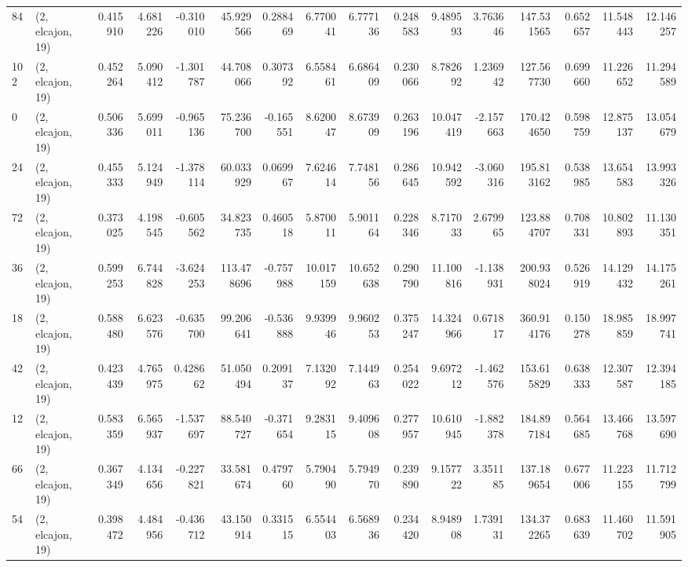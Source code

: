 \begin{tabular}{llrrrrrrrrrrrrrr}
84  &  (2, elcajon, 19) &   0.415910 &   4.681226 &  -0.310010 &    45.929566 &   0.288469 &   6.770041 &   6.777136 &  0.248583 &   9.489593 &   3.763646 &   147.531565 &  0.652657 &  11.548443 &  12.146257 \\
102 &  (2, elcajon, 19) &   0.452264 &   5.090412 &  -1.301787 &    44.708066 &   0.307392 &   6.558461 &   6.686409 &  0.230066 &   8.782692 &   1.236942 &   127.567730 &  0.699660 &  11.226652 &  11.294589 \\
0   &  (2, elcajon, 19) &   0.506336 &   5.699011 &  -0.965136 &    75.236700 &  -0.165551 &   8.620047 &   8.673909 &  0.263196 &  10.047419 &  -2.157663 &   170.424650 &  0.598759 &  12.875137 &  13.054679 \\
24  &  (2, elcajon, 19) &   0.455333 &   5.124949 &  -1.378114 &    60.033929 &   0.069967 &   7.624614 &   7.748156 &  0.286645 &  10.942592 &  -3.060316 &   195.813162 &  0.538985 &  13.654583 &  13.993326 \\
72  &  (2, elcajon, 19) &   0.373025 &   4.198545 &  -0.605562 &    34.823735 &   0.460518 &   5.870011 &   5.901164 &  0.228346 &   8.717033 &   2.679965 &   123.884707 &  0.708331 &  10.802893 &  11.130351 \\
36  &  (2, elcajon, 19) &   0.599253 &   6.744828 &  -3.624253 &   113.478696 &  -0.757988 &  10.017159 &  10.652638 &  0.290790 &  11.100816 &  -1.138931 &   200.938024 &  0.526919 &  14.129432 &  14.175261 \\
18  &  (2, elcajon, 19) &   0.588480 &   6.623576 &  -0.635700 &    99.206641 &  -0.536888 &   9.939946 &   9.960253 &  0.375247 &  14.324966 &   0.671817 &   360.914176 &  0.150278 &  18.985859 &  18.997741 \\
42  &  (2, elcajon, 19) &   0.423439 &   4.765975 &   0.428662 &    51.050494 &   0.209137 &   7.132092 &   7.144963 &  0.254022 &   9.697212 &  -1.462576 &   153.615829 &  0.638333 &  12.307587 &  12.394185 \\
12  &  (2, elcajon, 19) &   0.583359 &   6.565937 &  -1.537697 &    88.540727 &  -0.371654 &   9.283115 &   9.409608 &  0.277957 &  10.610945 &  -1.882378 &   184.897184 &  0.564685 &  13.466768 &  13.597690 \\
66  &  (2, elcajon, 19) &   0.367349 &   4.134656 &  -0.227821 &    33.581674 &   0.479760 &   5.790490 &   5.794970 &  0.239890 &   9.157722 &   3.351185 &   137.189654 &  0.677006 &  11.223155 &  11.712799 \\
54  &  (2, elcajon, 19) &   0.398472 &   4.484956 &  -0.436712 &    43.150914 &   0.331515 &   6.554403 &   6.568936 &  0.234420 &   8.948908 &   1.739131 &   134.372265 &  0.683639 &  11.460702 &  11.591905 \\

\end{tabular}
